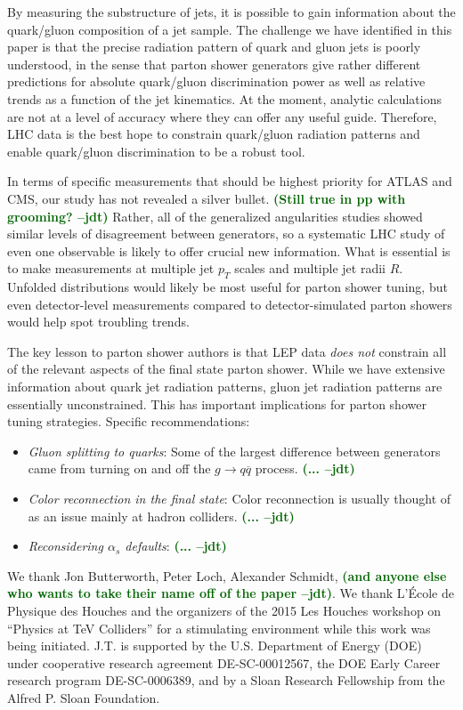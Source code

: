 \documentclass[11pt,letterpaper]{article}
\newcommand{\jdt}[1]{\textbf{\textcolor{darkgreen}{(#1 --jdt)}}}
\begin{document}
By measuring the substructure of jets, it is possible to gain information about the quark/gluon composition of a jet sample.  The challenge we have identified in this paper is that the precise radiation pattern of quark and gluon jets is poorly understood, in the sense that parton shower generators give rather different predictions for absolute quark/gluon discrimination power as well as relative trends as a function of the jet kinematics.  At the moment, analytic calculations are not at a level of accuracy where they can offer any useful guide.  Therefore, LHC data is the best hope to constrain quark/gluon radiation patterns and enable quark/gluon discrimination to be a robust tool.

In terms of specific measurements that should be highest priority for ATLAS and CMS, our study has not revealed a silver bullet.  \jdt{Still true in pp with grooming?}  Rather, all of the generalized angularities studies showed similar levels of disagreement between generators, so a systematic LHC study of even one observable is likely to offer crucial new information.  What is essential is to make measurements at multiple jet $p_T$ scales and multiple jet radii $R$.  Unfolded distributions would likely be most useful for parton shower tuning, but even detector-level measurements compared to detector-simulated parton showers would help spot troubling trends.

The key lesson to parton shower authors is that LEP data \emph{does not} constrain all of the relevant aspects of the final state parton shower.  While we have extensive information about quark jet radiation patterns, gluon jet radiation patterns are essentially unconstrained.  This has important implications for parton shower tuning strategies.  Specific recommendations:
\begin{itemize}
\item \textit{Gluon splitting to quarks}:  Some of the largest difference between generators came from turning on and off the $g \to q \overline{q}$ process.  \jdt{...}
\item \textit{Color reconnection in the final state}:  Color reconnection is usually thought of as an issue mainly at hadron colliders.  \jdt{...}
\item \textit{Reconsidering $\alpha_s$ defaults}:  \jdt{...}
\end{itemize}




\begin{acknowledgments}
We thank Jon Butterworth, Peter Loch, Alexander Schmidt, \jdt{and anyone else who wants to take their name off of the paper}.  We thank L'\'{E}cole de Physique des Houches and the organizers of the 2015 Les Houches workshop on ``Physics at TeV Colliders'' for a stimulating environment while this work was being initiated.  J.T. is supported by the U.S. Department of Energy (DOE) under cooperative research agreement DE-SC-00012567, the DOE Early Career research program DE-SC-0006389, and by a Sloan Research Fellowship from the Alfred P. Sloan Foundation.

\end{acknowledgments}




\end{document}
